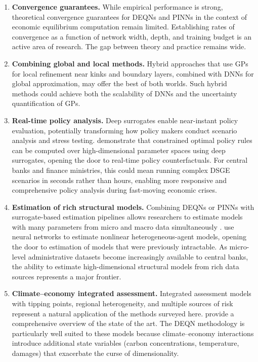 \documentclass[11pt,a4paper]{report}
\begin{document}
\begin{enumerate}[itemsep=4pt]
\item \textbf{Convergence guarantees.}  While empirical performance is strong, theoretical convergence guarantees for DEQNs and PINNs in the context of economic equilibrium computation remain limited.  Establishing rates of convergence as a function of network width, depth, and training budget is an active area of research.  The gap between theory and practice remains wide.

\item \textbf{Combining global and local methods.}  Hybrid approaches that use GPs for local refinement near kinks and boundary layers, combined with DNNs for global approximation, may offer the best of both worlds.  Such hybrid methods could achieve both the scalability of DNNs and the uncertainty quantification of GPs.

\item \textbf{Real-time policy analysis.}  Deep surrogates enable near-instant policy evaluation, potentially transforming how policy makers conduct scenario analysis and stress testing.  \citet{kubler2025using} demonstrate that constrained optimal policy rules can be computed over high-dimensional parameter spaces using deep surrogates, opening the door to real-time policy counterfactuals.  For central banks and finance ministries, this could mean running complex DSGE scenarios in seconds rather than hours, enabling more responsive and comprehensive policy analysis during fast-moving economic crises.

\item \textbf{Estimation of rich structural models.}  Combining DEQNs or PINNs with surrogate-based estimation pipelines allows researchers to estimate models with many parameters from micro and macro data simultaneously \citep{friedlDeep2023, chen2025Deep}.  \citet{kase2022estimating} use neural networks to estimate nonlinear heterogeneous-agent models, opening the door to estimation of models that were previously intractable.  As micro-level administrative datasets become increasingly available to central banks, the ability to estimate high-dimensional structural models from rich data sources represents a major frontier.

\item \textbf{Climate--economy integrated assessment.}  Integrated assessment models with tipping points, regional heterogeneity, and multiple sources of risk represent a natural application of the methods surveyed here.  \citet{fernandezvillaverde2025climate} provide a comprehensive overview of the state of the art.  The DEQN methodology is particularly well suited to these models because climate--economy interactions introduce additional state variables (carbon concentrations, temperature, damages) that exacerbate the curse of dimensionality.


\end{enumerate}
\end{document}
